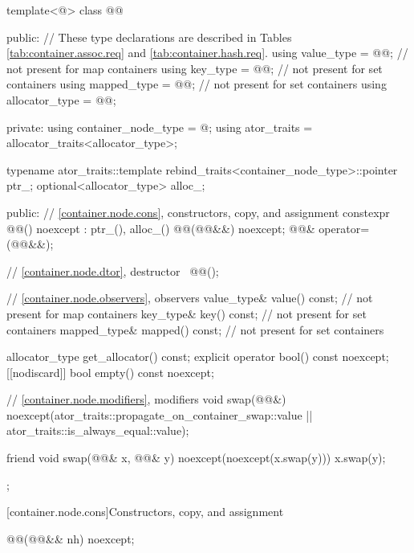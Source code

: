\begin{codeblock}
template<@\unspecnc@>
class @@ {
public:
  // These type declarations are described in Tables \ref{tab:container.assoc.req} and \ref{tab:container.hash.req}.
  using value_type     = @\seebelownc{}@;     // not present for map containers
  using key_type       = @\seebelownc{}@;     // not present for set containers
  using mapped_type    = @\seebelownc{}@;     // not present for set containers
  using allocator_type = @\seebelownc{}@;

private:
  using container_node_type = @\unspecnc@;
  using ator_traits = allocator_traits<allocator_type>;

  typename ator_traits::template rebind_traits<container_node_type>::pointer ptr_;
  optional<allocator_type> alloc_;

public:
  // \ref{container.node.cons}, constructors, copy, and assignment
  constexpr @@() noexcept : ptr_(), alloc_() {}
  @@(@@&&) noexcept;
  @@& operator=(@@&&);

  // \ref{container.node.dtor}, destructor
  ~@@();

  // \ref{container.node.observers}, observers
  value_type& value() const;            // not present for map containers
  key_type& key() const;                // not present for set containers
  mapped_type& mapped() const;          // not present for set containers

  allocator_type get_allocator() const;
  explicit operator bool() const noexcept;
  [[nodiscard]] bool empty() const noexcept;

  // \ref{container.node.modifiers}, modifiers
  void swap(@@&)
    noexcept(ator_traits::propagate_on_container_swap::value ||
             ator_traits::is_always_equal::value);

  friend void swap(@@& x, @@& y) noexcept(noexcept(x.swap(y))) {
    x.swap(y);
  }
};
\end{codeblock}

[container.node.cons]{Constructors, copy, and assignment}

\begin{itemdecl}
@@(@@&& nh) noexcept;
\end{itemdecl}

